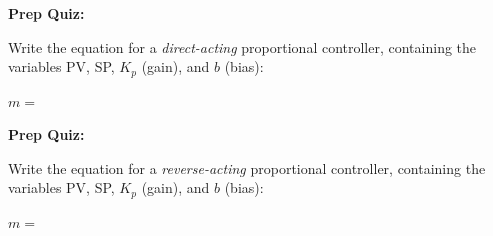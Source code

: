 
\vfil \eject

\noindent
{\bf Prep Quiz:}

Write the equation for a {\it direct-acting} proportional controller, containing the variables PV, SP, $K_p$ (gain), and $b$ (bias):

\vskip 10pt

$m =$

\vfil \eject

\noindent
{\bf Prep Quiz:}

Write the equation for a {\it reverse-acting} proportional controller, containing the variables PV, SP, $K_p$ (gain), and $b$ (bias):

\vskip 10pt

$m =$





